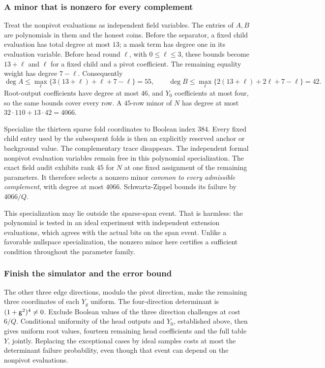 \subsubsection{A minor that is nonzero for every complement}

Treat the nonpivot evaluations as independent field variables. The entries of $A,B$ are polynomials in them and the honest coins. Before the separator, a fixed child evaluation has total degree at most $13$; a mask term has degree one in its evaluation variable. Before head round $\ell$, with $0\le\ell\le3$, these bounds become $13+\ell$ and $\ell$ for a fixed child and a pivot coefficient. The remaining equality weight has degree $7-\ell$. Consequently
\[
 \deg A\le\max_\ell\{3(13+\ell)+\ell+7-\ell\}=55,
 \qquad
 \deg B\le\max_\ell\{2(13+\ell)+2\ell+7-\ell\}=42.
\]
Root-output coefficients have degree at most $46$, and $Y_0$ coefficients at most four, so the same bounds cover every row. A $45$-row minor of $N$ has degree at most $32\cdot110+13\cdot42=4066$.

Specialize the thirteen sparse fold coordinates to Boolean index $384$. Every fixed child entry used by the subsequent folds is then an explicitly reserved anchor or background value. The complementary trace disappears. The independent formal nonpivot evaluation variables remain free in this polynomial specialization. The exact field audit exhibits rank $45$ for $N$ at one fixed assignment of the remaining parameters. It therefore selects a nonzero minor \emph{common to every admissible complement}, with degree at most $4066$. Schwartz-Zippel bounds its failure by $4066/Q$.

This specialization may lie outside the sparse-span event. That is harmless: the polynomial is tested in an ideal experiment with independent extension evaluations, which agrees with the actual bits on the span event. Unlike a favorable nullspace specialization, the nonzero minor here certifies a sufficient condition throughout the parameter family.

\subsubsection{Finish the simulator and the error bound}

The other three edge directions, modulo the pivot direction, make the remaining three coordinates of each $Y_g$ uniform. The four-direction determinant is $(1+\mathsf{g}^2)^4\ne0$. Exclude Boolean values of the three direction challenges at cost $6/Q$. Conditional uniformity of the head outputs and $Y_0$, established above, then gives uniform root values, fourteen remaining head coefficients and the full table $Y$, jointly. Replacing the exceptional cases by ideal samples costs at most the determinant failure probability, even though that event can depend on the nonpivot evaluations.

